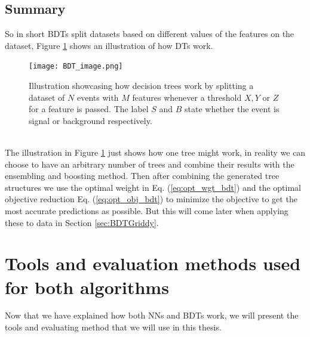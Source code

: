 \documentclass[12pt, a4paper]{book}
\begin{document}
\subsection{Summary}
So in short BDTs split datasets based on different values of the features on the dataset, Figure \ref{fig:DT_ilus} shows an illustration of how DTs work.
\graphicspath{{../../figures/}}
\begin{figure}[!ht]
	\centering
    \texttt{[image: BDT\_image.png]}
    \caption[Basic Decision Tree illustration]{Illustration showcasing how decision trees work by splitting a dataset of $N$ events with $M$ features whenever a threshold $X, Y$ or $Z$ for a feature is passed. The label $S$ and $B$ state whether the event is signal or background respectively.}\label{fig:DT_ilus}
\end{figure}
\\The illustration in Figure \ref{fig:DT_ilus} just shows how one tree might work, in reality we can choose to have an arbitrary number of trees and combine their results with the ensembling and boosting method. Then after combining the generated tree structures we use the optimal weight in Eq. (\ref{eq:opt_wgt_bdt}) and the optimal objective reduction Eq. (\ref{eq:opt_obj_bdt}) 
to minimize the objective to get the most accurate predictions as possible. But this will come later when applying these to data in Section \ref{sec:BDTGriddy}.

\clearpage
\section[Tools and evaluation methods]{Tools and evaluation methods used for both algorithms}\label{sec:tools}
Now that we have explained how both NNs and BDTs work, we will present the tools and evaluating method that we will use in this thesis. 
\end{document}

